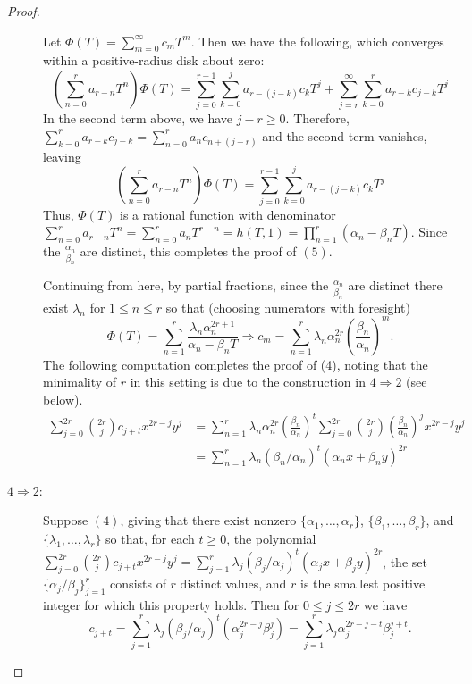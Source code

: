 \documentclass[12pt,reqno]{article}
\begin{document}
\begin{proof}
\begin{description}
Let $\Phi(T) = \sum_{m=0}^\infty c_m T^m$. Then we have the following, which converges within a positive-radius disk about zero:
$$ \left(\sum_{n=0}^r a_{r-n}T^n\right)\Phi(T) = \sum_{j=0}^{r-1}\sum_{k=0}^j a_{r-(j-k)}c_k T^j + \sum_{j=r}^\infty \sum_{k=0}^r a_{r-k}c_{j-k}T^j $$
In the second term above, we have $j-r\geq 0$. Therefore, $\sum_{k=0}^r a_{r-k}c_{j-k} = \sum_{n=0}^r a_n c_{n+(j-r)}$ and the second term vanishes, leaving 
$$ \left(\sum_{n=0}^r a_{r-n}T^n\right)\Phi(T) = \sum_{j=0}^{r-1}\sum_{k=0}^j a_{r-(j-k)}c_k T^j $$
Thus, $\Phi(T)$ is a rational function with denominator $\sum_{n=0}^r a_{r-n}T^n = \sum_{n=0}^r a_{n}T^{r-n} = h(T,1) = \prod_{n=1}^r (\alpha_n-\beta_nT )$. Since the $\frac{\alpha_n}{\beta_n}$ are distinct, this completes the proof of $(5)$. 

Continuing from here, by partial fractions, since the $\frac{\alpha_n}{\beta_n}$ are distinct there exist $\lambda_n$ for $1\leq n\leq r$ so that (choosing numerators with foresight)
$$ \Phi(T) = \sum_{n=1}^r \frac{\lambda_n\alpha_n^{2r+1}}{\alpha_n-\beta_nT} \Rightarrow c_m = \sum_{n=1}^r \lambda_n\alpha_n^{2r}\left(\frac{\beta_n}{\alpha_n}\right)^m.$$ 
The following computation completes the proof of (4), noting that the minimality of $r$ in this setting is due to the construction in $4 \Rightarrow 2$ (see below). 
\begin{align*}
\sum_{j=0}^{2r} \binom{2r}{j} c_{j+t} x^{2r-j} y^{j} &= \sum_{n=1}^r \lambda_n\alpha_n^{2r} \left(\frac{\beta_n}{\alpha_n}\right)^{t} \sum_{j=0}^{2r} \binom{2r}{j}  \left(\frac{\beta_n}{\alpha_n}\right)^{j} x^{2r-j} y^{j} \\
&= \sum_{n=1}^r \lambda_n (\beta_n/\alpha_n)^t (\alpha_n x + \beta_n y)^{2r}
\end{align*}


\item[$4 \Rightarrow 2$:] Suppose $(4)$, giving that there exist nonzero $\{\alpha_1,\ldots,\alpha_r\}$, $\{\beta_1,\ldots,\beta_r\}$, and $\{\lambda_1,\ldots,\lambda_r\}$ so that, for each $t \geq 0$, the polynomial $\sum_{j=0}^{2r} \binom{2r}{j} c_{j+t} x^{2r-j} y^{j} = \sum_{j=1}^r \lambda_j (\beta_j/\alpha_j)^t (\alpha_j x + \beta_j y)^{2r}$, the set $\{\alpha_j/\beta_j\}_{j=1}^r$ consists of $r$ distinct values, and $r$ is the smallest positive integer for which this property holds. Then for $0\leq j \leq 2r$ we have $$ c_{j+t} = \sum_{j=1}^r \lambda_j (\beta_j/\alpha_j)^t (\alpha_j^{2r-j}\beta_j^{j}) = \sum_{j=1}^r \lambda_j \alpha_j^{2r-j-t} \beta_j^{j+t}.$$ 


\end{description}
\end{proof}
\end{document}
